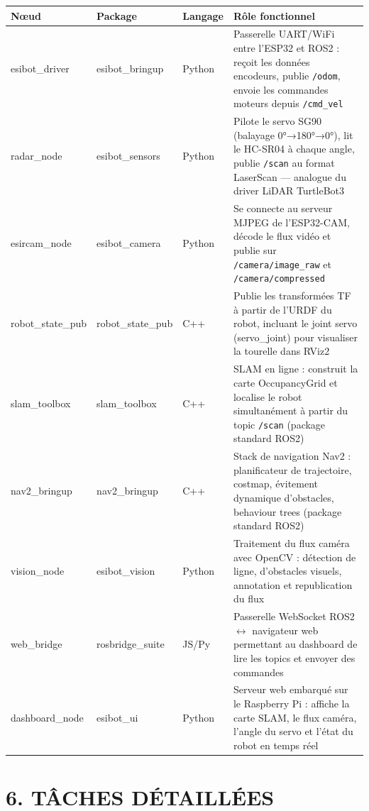 \documentclass[12pt,a4paper]{article}
\begin{document}
\begin{longtable}{p{3cm} p{3cm} p{1.5cm} p{6cm}}
\toprule
\textbf{Nœud} & \textbf{Package} & \textbf{Langage} & \textbf{Rôle fonctionnel} \\
\midrule
\endhead
esibot\_driver & esibot\_bringup & Python & Passerelle UART/WiFi entre l'ESP32 et ROS2 : reçoit les données encodeurs, publie \texttt{/odom}, envoie les commandes moteurs depuis \texttt{/cmd\_vel} \\[4pt]
radar\_node & esibot\_sensors & Python & Pilote le servo SG90 (balayage 0°→180°→0°), lit le HC-SR04 à chaque angle, publie \texttt{/scan} au format LaserScan — analogue du driver LiDAR TurtleBot3 \\[4pt]
esircam\_node & esibot\_camera & Python & Se connecte au serveur MJPEG de l'ESP32-CAM, décode le flux vidéo et publie sur \texttt{/camera/image\_raw} et \texttt{/camera/compressed} \\[4pt]
robot\_state\_pub & robot\_state\_pub & C++ & Publie les transformées TF à partir de l'URDF du robot, incluant le joint servo (servo\_joint) pour visualiser la tourelle dans RViz2 \\[4pt]
slam\_toolbox & slam\_toolbox & C++ & SLAM en ligne : construit la carte OccupancyGrid et localise le robot simultanément à partir du topic \texttt{/scan} (package standard ROS2) \\[4pt]
nav2\_bringup & nav2\_bringup & C++ & Stack de navigation Nav2 : planificateur de trajectoire, costmap, évitement dynamique d'obstacles, behaviour trees (package standard ROS2) \\[4pt]
vision\_node & esibot\_vision & Python & Traitement du flux caméra avec OpenCV : détection de ligne, d'obstacles visuels, annotation et republication du flux \\[4pt]
web\_bridge & rosbridge\_suite & JS/Py & Passerelle WebSocket ROS2 $\leftrightarrow$ navigateur web permettant au dashboard de lire les topics et envoyer des commandes \\[4pt]
dashboard\_node & esibot\_ui & Python & Serveur web embarqué sur le Raspberry Pi : affiche la carte SLAM, le flux caméra, l'angle du servo et l'état du robot en temps réel \\
\bottomrule
\end{longtable}

\section{6. TÂCHES DÉTAILLÉES}
\end{document}
